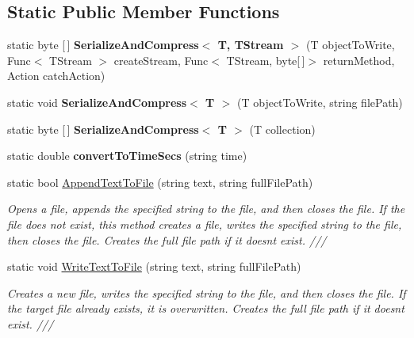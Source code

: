 \subsection*{Static Public Member Functions}
\begin{DoxyCompactItemize}
\item 
\mbox{\label{class_b_n_a30_1_1_form1_add166799c4e1393285f4b9c1015b1363}} 
static byte \mbox{[}$\,$\mbox{]} {\bfseries Serialize\+And\+Compress$<$ T, T\+Stream $>$} (T object\+To\+Write, Func$<$ T\+Stream $>$ create\+Stream, Func$<$ T\+Stream, byte\mbox{[}$\,$\mbox{]}$>$ return\+Method, Action catch\+Action)
\item 
\mbox{\label{class_b_n_a30_1_1_form1_a45699bc22ba36c7a139a22ca317f15b1}} 
static void {\bfseries Serialize\+And\+Compress$<$ T $>$} (T object\+To\+Write, string file\+Path)
\item 
\mbox{\label{class_b_n_a30_1_1_form1_a6ea64ad48ac09385699d2072de775959}} 
static byte \mbox{[}$\,$\mbox{]} {\bfseries Serialize\+And\+Compress$<$ T $>$} (T collection)
\item 
\mbox{\label{class_b_n_a30_1_1_form1_a64f62ca6e25b39d6e01a33d9c9953573}} 
static double {\bfseries convert\+To\+Time\+Secs} (string time)
\item 
static bool \mbox{\hyperlink{class_b_n_a30_1_1_form1_a8ab552e073dad815b5b7cfb57b62784e}{Append\+Text\+To\+File}} (string text, string full\+File\+Path)
\begin{DoxyCompactList}\small\item\em Opens a file, appends the specified string to the file, and then closes the file. If the file does not exist, this method creates a file, writes the specified string to the file, then closes the file. Creates the full file path if it doesn\textquotesingle{}t exist. /// \end{DoxyCompactList}\item 
static void \mbox{\hyperlink{class_b_n_a30_1_1_form1_ac46dcf3077044b069916fd683d2030d9}{Write\+Text\+To\+File}} (string text, string full\+File\+Path)
\begin{DoxyCompactList}\small\item\em Creates a new file, writes the specified string to the file, and then closes the file. If the target file already exists, it is overwritten. Creates the full file path if it doesn\textquotesingle{}t exist. /// \end{DoxyCompactList}\end{DoxyCompactItemize}
